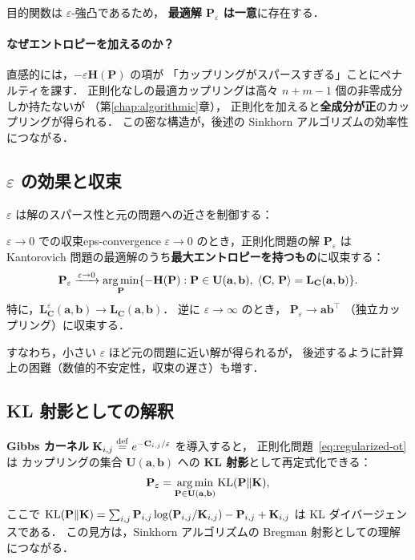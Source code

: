 目的関数は $\varepsilon$-強凸であるため，
\textbf{最適解 $\mathbf{P}_\varepsilon$ は一意}に存在する．

\paragraph{なぜエントロピーを加えるのか？}
直感的には，$-\varepsilon \mathbf{H}(\mathbf{P})$ の項が
「カップリングがスパースすぎる」ことにペナルティを課す．
正則化なしの最適カップリングは高々 $n+m-1$ 個の非零成分しか持たないが
（第\ref{chap:algorithmic}章），
正則化を加えると\textbf{全成分が正}のカップリングが得られる．
この密な構造が，後述の Sinkhorn アルゴリズムの効率性につながる．

\subsection{$\varepsilon$ の効果と収束}\label{subsec:eps-effect}

$\varepsilon$ は解のスパース性と元の問題への近さを制御する：

\begin{proposition}{$\varepsilon \to 0$ での収束}{eps-convergence}
$\varepsilon \to 0$ のとき，正則化問題の解
$\mathbf{P}_\varepsilon$ は
Kantorovich 問題の最適解のうち\textbf{最大エントロピーを持つもの}に収束する：
\[
  \mathbf{P}_\varepsilon \xrightarrow{\varepsilon \to 0}
  \operatorname*{arg\,min}_{\mathbf{P}}
  \{-\mathbf{H}(\mathbf{P}) :
  \mathbf{P} \in \mathbf{U}(\mathbf{a}, \mathbf{b}),\;
  \langle \mathbf{C},\, \mathbf{P} \rangle = \mathbf{L_C}(\mathbf{a}, \mathbf{b})\}.
\]
特に，$\mathbf{L}^\varepsilon_{\mathbf{C}}(\mathbf{a}, \mathbf{b})
\to \mathbf{L_C}(\mathbf{a}, \mathbf{b})$．
逆に $\varepsilon \to \infty$ のとき，
$\mathbf{P}_\varepsilon \to \mathbf{a}\mathbf{b}^\top$
（独立カップリング）に収束する．
\end{proposition}

すなわち，小さい $\varepsilon$ ほど元の問題に近い解が得られるが，
後述するように計算上の困難（数値的不安定性，収束の遅さ）も増す．

\subsection{KL 射影としての解釈}\label{subsec:kl-projection}

\textbf{Gibbs カーネル}
$\mathbf{K}_{i,j} \overset{\mathrm{def}}{=} e^{-\mathbf{C}_{i,j}/\varepsilon}$
を導入すると，
正則化問題~\eqref{eq:regularized-ot}は
カップリングの集合 $\mathbf{U}(\mathbf{a}, \mathbf{b})$
への \textbf{KL 射影}として再定式化できる：
\begin{equation}\label{eq:kl-projection}
  \mathbf{P}_\varepsilon
  = \operatorname*{arg\,min}_{\mathbf{P} \in \mathbf{U}(\mathbf{a}, \mathbf{b})}
  \operatorname{KL}(\mathbf{P} \| \mathbf{K}),
\end{equation}
ここで $\operatorname{KL}(\mathbf{P}\|\mathbf{K})
= \sum_{i,j} \mathbf{P}_{i,j} \log(\mathbf{P}_{i,j}/\mathbf{K}_{i,j})
- \mathbf{P}_{i,j} + \mathbf{K}_{i,j}$ は
KL ダイバージェンスである．
この見方は，Sinkhorn アルゴリズムの
Bregman 射影としての理解につながる．


